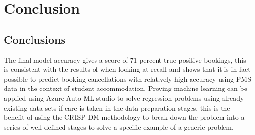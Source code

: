 \chapter{Conclusion}
\label{ch:con}

\section{Conclusions}


The final model accuracy gives a score of 71 percent true positive bookings, this is consistent with the results of \cite{Antonio2017PredictingRevenue} when looking at recall and shows that it is in fact possible to predict booking cancellations with relatively high accuracy using PMS data in the context of student accommodation. Proving  machine learning can be applied using Azure Auto ML studio to solve regression problems using already existing data sets if care is taken in the data preparation stages, this is the benefit of using the CRISP-DM methodology to break down the problem into a series of well defined stages to solve a specific example of a generic problem.






